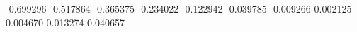 -0.699296
-0.517864
-0.365375
-0.234022
-0.122942
-0.039785
-0.009266
0.002125
0.004670
0.013274
0.040657
